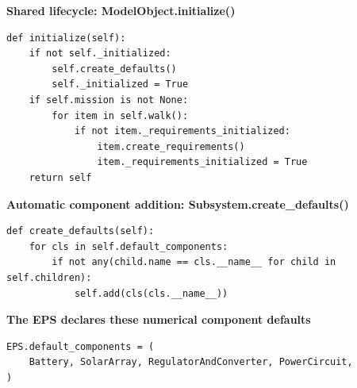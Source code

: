 \documentclass[border=5pt]{standalone}
\begin{document}
\begin{minipage}{510pt}
\fontsize{10}{12}\selectfont
\begin{minipage}[t]{506pt}
\vspace{0pt}\textbf{Shared lifecycle: ModelObject.initialize()}\par\smallskip
\begin{lstlisting}[style=report-python,basicstyle=\ttfamily\fontsize{8.5}{10.88}\selectfont]
def initialize(self):
    if not self._initialized:
        self.create_defaults()
        self._initialized = True
    if self.mission is not None:
        for item in self.walk():
            if not item._requirements_initialized:
                item.create_requirements()
                item._requirements_initialized = True
    return self
\end{lstlisting}
\end{minipage}\par\medskip\begin{minipage}[t]{506pt}
\vspace{0pt}\textbf{Automatic component addition: Subsystem.create\_defaults()}\par\smallskip
\begin{lstlisting}[style=report-python,basicstyle=\ttfamily\fontsize{8.5}{10.88}\selectfont]
def create_defaults(self):
    for cls in self.default_components:
        if not any(child.name == cls.__name__ for child in self.children):
            self.add(cls(cls.__name__))
\end{lstlisting}
\end{minipage}\par\medskip\begin{minipage}[t]{506pt}
\vspace{0pt}\textbf{The EPS declares these numerical component defaults}\par\smallskip
\begin{lstlisting}[style=report-python,basicstyle=\ttfamily\fontsize{8.5}{10.88}\selectfont]
EPS.default_components = (
    Battery, SolarArray, RegulatorAndConverter, PowerCircuit,
)
\end{lstlisting}
\end{minipage}
\end{minipage}
\end{document}
